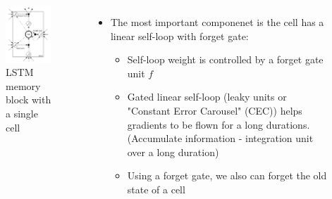 \documentclass{beamer}
\begin{document}
{
	\begin{columns}
		\begin{figure}[ht]  
			\begin{center}
				\includegraphics[width=1.8in]{Images/LSTM_detail.png}   
			\end{center}   
			\caption{\centering LSTM memory block with a single cell}
		\end{figure}
		\begin{itemize}
		\item The most important componenet is the cell has a linear self-loop with forget gate: 
		\begin{itemize}
			\item Self-loop weight is controlled by a forget gate unit ${ f }$
			\item Gated linear self-loop (leaky units or "Constant Error Carousel" (CEC)) helps gradients to be flown for a long durations. (Accumulate information - integration unit over a long duration) 
			\item Using a forget gate, we also can forget the old state of a cell 
		\end{itemize}
		\end{itemize}
	\end{columns}
}
\frame
\end{document}
